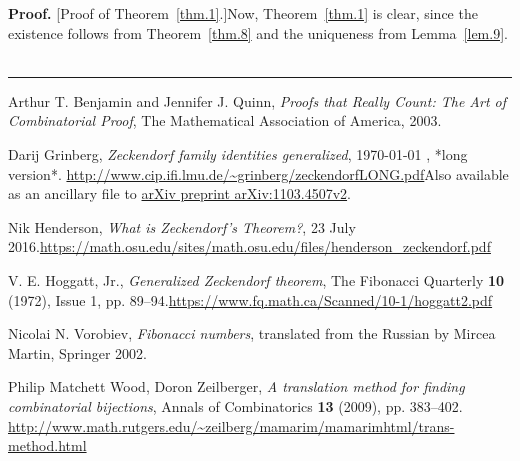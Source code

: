 \documentclass[numbers=enddot,12pt,final,onecolumn,notitlepage]{scrartcl}%
\numberwithin{exer}{section}
\theoremstyle{definition}
\newenvironment{proof}[1][Proof]{\noindent\textbf{#1.} }{\ \rule{0.5em}{0.5em}}
\begin{document}
\begin{proof}
[Proof of Theorem~\ref{thm.1}.]Now, Theorem~\ref{thm.1} is clear, since the
existence follows from Theorem~\ref{thm.8} and the uniqueness from
Lemma~\ref{lem.9}.
\end{proof}

\begin{thebibliography}{99999999}                                                                                         %


Arthur T. Benjamin and Jennifer J. Quinn,
\textit{Proofs that Really Count: The Art of Combinatorial Proof}, The
Mathematical Association of America, 2003.

Darij Grinberg, \textit{Zeckendorf family
identities generalized},
\today
, *long version*.\newline%
\url{http://www.cip.ifi.lmu.de/~grinberg/zeckendorfLONG.pdf}\newline Also
available as an ancillary file to
\href{https://arxiv.org/abs/1103.4507v2}{arXiv preprint arXiv:1103.4507v2}.

Nik Henderson, \textit{What is Zeckendorf's
Theorem?}, 23 July 2016.\newline\url{https://math.osu.edu/sites/math.osu.edu/files/henderson_zeckendorf.pdf}

V. E. Hoggatt, Jr., \textit{Generalized Zeckendorf
theorem}, The Fibonacci Quarterly \textbf{10} (1972), Issue 1, pp.
89--94.\newline\url{https://www.fq.math.ca/Scanned/10-1/hoggatt2.pdf}

Nicolai N. Vorobiev, \textit{Fibonacci numbers},
translated from the Russian by Mircea Martin, Springer 2002.

Philip Matchett Wood, Doron Zeilberger, \textit{A
translation method for finding combinatorial bijections}, Annals of
Combinatorics \textbf{13} (2009), pp. 383--402. \newline\url{http://www.math.rutgers.edu/~zeilberg/mamarim/mamarimhtml/trans-method.html}
\end{thebibliography}
\end{document}
